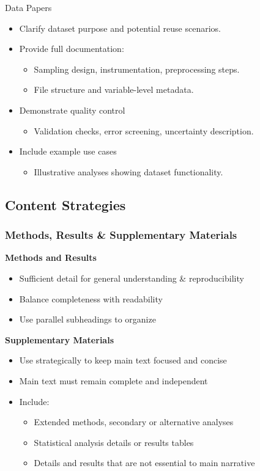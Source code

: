 \documentclass{beamer}
\begin{document}
\begin{frame}{Data Papers}
\begin{itemize}
    \item Clarify dataset purpose and potential reuse scenarios.
    \item Provide full documentation:
    \begin{itemize}
        \item Sampling design, instrumentation, preprocessing steps.
        \item File structure and variable-level metadata.
    \end{itemize}
    \item Demonstrate quality control
    \begin{itemize}
        \item Validation checks, error screening, uncertainty description.
    \end{itemize}
    \item Include example use cases
    \begin{itemize}
        \item Illustrative analyses showing dataset functionality.
    \end{itemize}
\end{itemize}

\end{frame}


\subsection{Content Strategies}

\begin{frame}
  \frametitle{Methods, Results \& Supplementary Materials}
  \textbf{Methods and Results}
  \begin{itemize}
    \item Sufficient detail for general understanding \& reproducibility
    \item Balance completeness with readability
    \item Use parallel subheadings to organize
  \end{itemize}

  \textbf{Supplementary Materials}
  \begin{itemize}
    \item Use strategically to keep main text focused and concise
    \item Main text must remain complete and independent
    \item Include:
    \begin{itemize}
      \item Extended methods, secondary or alternative analyses
      \item Statistical analysis details or results tables
      \item Details and results that are not essential to main narrative
    \end{itemize}
  \end{itemize}
\end{frame}
\end{document}
